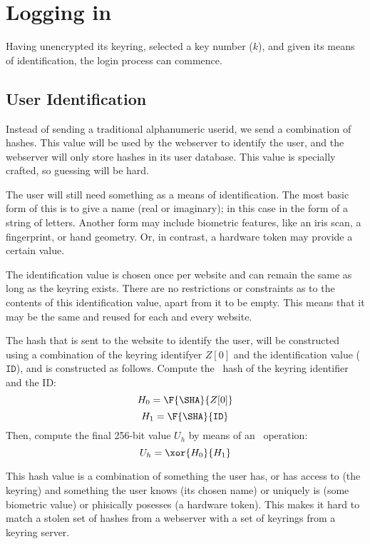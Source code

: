 %
%
%
\section{Logging in}
\label{logging_in}
Having unencrypted its keyring, selected a key number ($k$),
and given its means of identification,
the login process can commence.
\subsection{User Identification}
\label{sec:user_ids}
Instead of sending a traditional alphanumeric userid,
we send a combination of hashes.
This value will be used by the webserver to identify the user,
and the webserver will only store hashes in its user database.
This value is specially crafted,
so guessing will be hard.
\par
The user will still need something as a means of identification.
The most basic form of this is to give a name (real or imaginary);
in this case in the form of a string of letters.
Another form may include biometric features,
like an iris scan,
a fingerprint,
or hand geometry.
Or,
in contrast,
a hardware token may provide a certain value.
\par
The identification value is chosen once per website and can remain the same as long as the keyring exists.
There are no restrictions or constraints as to the contents of this identification value,
apart from it to be empty.
This means that it may be the same and reused for each and every website.
\par
The hash that is sent to the website to identify the user,
will be constructed using a combination of the keyring identifyer $Z[0]$ and the identification value ($\mathtt{ID}$),
and is constructed as follows.
Compute the \SHA\ hash of the keyring identifier and the ID:
\[H_0=\F{\SHA}{Z[0]}\]
\[H_1=\F{\SHA}{\mathtt{ID}}\]
Then, compute the final 256-bit value $U_h$ by means of an \XOR\ operation:
\[U_h=\xor{H_0}{H_1}\]
\par
This hash value is a combination of something the user has,
or has access to
(the keyring)
and something the user knows
(its chosen name)
or uniquely is
(some biometric value)
or phisically posesses
(a hardware token).
This makes it hard to match a stolen set of hashes from a webserver with a set of keyrings from a keyring server.

